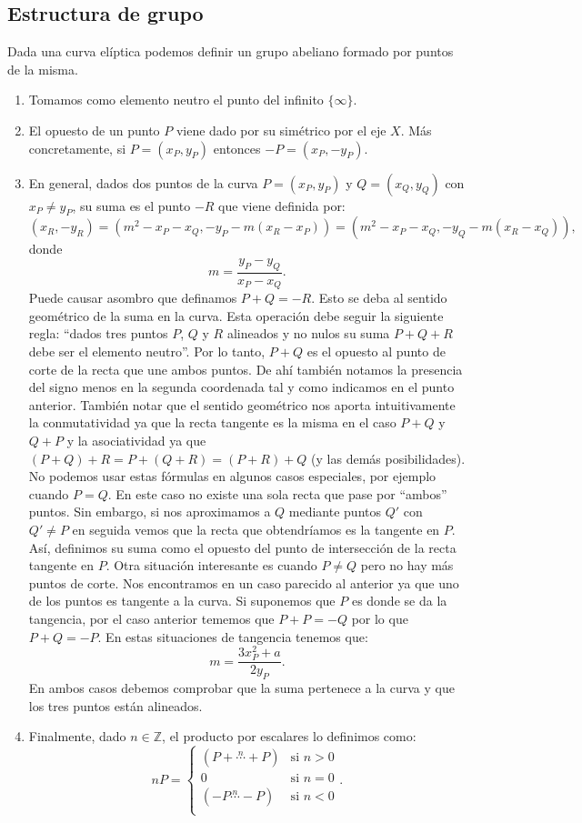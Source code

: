 \documentclass[11pt]{article}
\begin{document}
\subsection{Estructura de grupo}
Dada una curva elíptica podemos definir un grupo abeliano formado por puntos de la misma. 
\begin{enumerate}
\item Tomamos como elemento neutro el punto del infinito $ \{\infty\} $.
\item El opuesto de un punto $ P $ viene dado por su simétrico por el eje $ X $. Más concretamente, si $ P = (x_P, y_P) $ entonces $ -P = (x_P, -y_P) $.
\item En general, dados dos puntos de la curva $ P = (x_P, y_P) $ y $ Q = (x_Q, y_Q) $ con $ x_P \neq y_P $, su suma es el punto $ -R $ que viene definida por:
\[
(x_R, -y_R) =(m^2 − x_P − x_Q, -y_P - m(x_R − x_P )) = (m^2 − x_P − x_Q, -y_Q - m(x_R − x_Q )),
\]
donde
\[
m = \frac{y_P-y_Q}{x_P-x_Q}.
\]
Puede causar asombro que definamos $ P+Q=-R $. Esto se deba al sentido geométrico de la suma en la curva. Esta operación debe seguir la siguiente regla: ``dados tres puntos $ P$, $ Q $ y $ R $ alineados y no nulos su suma $ P + Q + R $ debe ser el elemento neutro''. Por lo tanto, $ P +Q $ es el opuesto al punto de corte de la recta que une ambos puntos. De ahí también notamos la presencia del signo menos en la segunda coordenada tal y como indicamos en el punto anterior. También notar que el sentido geométrico nos aporta intuitivamente la conmutatividad ya que la recta tangente es la misma en el caso $ P+Q $ y $ Q+P $ y la asociatividad ya que $ (P+Q) + R = P + (Q+R) = (P+R) + Q$ (y las demás posibilidades).\\

No podemos usar estas fórmulas en algunos casos especiales, por ejemplo cuando $ P=Q $. En este caso no existe una sola recta que pase por ``ambos'' puntos. Sin embargo, si nos aproximamos a $ Q $ mediante puntos $ Q' $ con $ Q' \neq P $ en seguida vemos que la recta que obtendríamos es la tangente en $ P $. Así, definimos su suma como el opuesto del punto de intersección de la recta tangente en $ P $. Otra situación interesante es cuando $ P \neq Q $ pero no hay más puntos de corte. Nos encontramos en un caso parecido al anterior ya que uno de los puntos es tangente a la curva. Si suponemos que $ P $ es donde se da la tangencia, por el caso anterior tememos que $ P + P = -Q $ por lo que $ P + Q = -P $. En estas situaciones de tangencia tenemos que:
\[
m = \frac{3x^{2}_P + a}{2y_P}.
\]
En ambos casos debemos comprobar que la suma pertenece a la curva y que los tres puntos están alineados.

\item Finalmente, dado $ n \in \mathbb{Z} $, el producto por escalares lo definimos como:
\[   
nP = 
\begin{cases}
 (P+\stackrel{n}{\cdots}+P) &\text{si } n > 0\\
0 &\text{si } n = 0\\
(-P\stackrel{n}{\cdots}-P) &\text{si } n < 0\\
\end{cases}.
\]
\end{enumerate}
\end{document}
